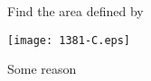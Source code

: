 \documentclass[14pt,fleqn]{extarticle}
\begin{document}
 
\begin{question}
	\statement 
    
    Find the area defined by 
    
    \begin{step}
  \begin{options} 
     \correct 
       
       \begin{center}
\texttt{[image: 1381-C.eps]}
\end{center}
        
    \end{options} 
     \reason
     
     Some reason  
       
\end{step} 
\end{question} 
\end{document}
